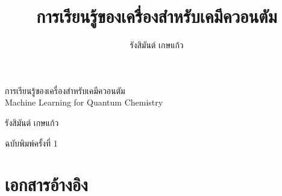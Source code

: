 



\let\cleardoublepage\clearpage

\title{การเรียนรู้ของเครื่องสำหรับเคมีควอนตัม}
\author{รังสิมันต์ เกษแก้ว}



\frontmatter

\thispagestyle{empty}

\begin{flushright}
\vspace*{2.0in}

\begin{spacing}{3}
{\Huge การเรียนรู้ของเครื่องสำหรับเคมีควอนตัม}\\
{\LARGE Machine Learning for Quantum Chemistry}
\end{spacing}

\vspace{0.25in}

{\Large รังสิมันต์ เกษแก้ว}

\vspace{1in}

{ฉบับพิมพ์ครั้งที่ 1}
\vspace{0.5in}

\vfill

\end{flushright}



 

\tableofcontents\label{cha:toc}


\mainmatter



 
 
 
 
 
 
 
 
 
 
 
 
\appendix
 
 

\backmatter

\chapter*{เอกสารอ้างอิง}

\printbibliography[heading=none]

\printindex


